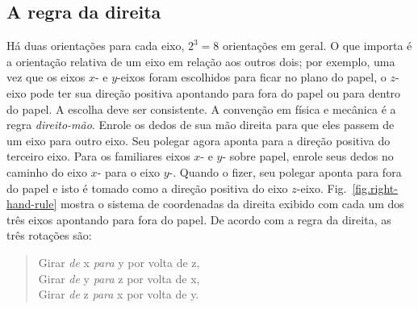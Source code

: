 
\subsection{A regra da direita}

Há duas orientações para cada eixo, $2^3=8$ orientações em geral. O que importa é a orientação relativa de um eixo em relação aos outros dois; por exemplo, uma vez que os eixos $x$- e $y$-eixos foram escolhidos para ficar no plano do papel, o $z$-eixo pode ter sua direção positiva apontando para fora do papel ou para dentro do papel. A escolha deve ser consistente. A convenção em física e mecânica é a regra \emph{direito-mão}. Enrole os dedos de sua mão direita para que eles passem de um eixo para outro eixo. Seu polegar agora aponta para a direção positiva do terceiro eixo. Para os familiares eixos $x$- e $y$- sobre papel, enrole seus dedos no caminho do eixo $x$- para o eixo $y$-. Quando o fizer, seu polegar aponta para fora do papel e isto é tomado como a direção positiva do eixo $z$-eixo. Fig.~\ref{fig.right-hand-rule} mostra o sistema de coordenadas da direita exibido com cada um dos três eixos apontando para fora do papel. De acordo com a regra da direita, as três rotações são:
\begin{quote}
\normalsize
Girar \emph{de} x \emph{para} y por volta de z,\\
Girar \emph{de} y \emph{para} z por volta de x,\\
Girar \emph{de} z \emph{para} x por volta de y.
\end{quote}

